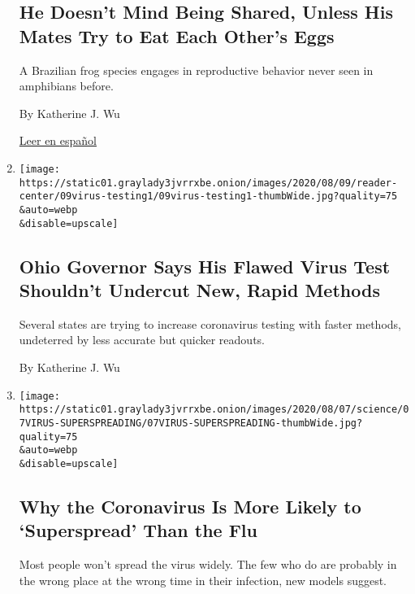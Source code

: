 \begin{enumerate}
{  \subsection{He Doesn't Mind Being Shared, Unless His Mates Try to Eat
  Each Other's
  Eggs}\label{he-doesnt-mind-being-shared-unless-his-mates-try-to-eat-each-others-eggs}}

  A Brazilian frog species engages in reproductive behavior never seen
  in amphibians before.

  By Katherine J. Wu

  \href{https://www.nytimes3xbfgragh.onion/es/2020/08/12/espanol/ciencia-y-tecnologia/ranas-brasil.html}{Leer
  en español}
\item
  \href{/2020/08/09/health/covid-testing.html}{}

  \texttt{[image: https://static01.graylady3jvrrxbe.onion/images/2020/08/09/reader-center/09virus-testing1/09virus-testing1-thumbWide.jpg?quality=75\\\&auto=webp\\\&disable=upscale]}

  \hypertarget{ohio-governor-says-his-flawed-virus-test-shouldnt-undercut-new-rapid-methods}{%
  \subsection{Ohio Governor Says His Flawed Virus Test Shouldn't
  Undercut New, Rapid
  Methods}\label{ohio-governor-says-his-flawed-virus-test-shouldnt-undercut-new-rapid-methods}}

  Several states are trying to increase coronavirus testing with faster
  methods, undeterred by less accurate but quicker readouts.

  By Katherine J. Wu
\item
  \href{/2020/08/07/health/coronavirus-superspreading-contagion.html}{}

  \texttt{[image: https://static01.graylady3jvrrxbe.onion/images/2020/08/07/science/07VIRUS-SUPERSPREADING/07VIRUS-SUPERSPREADING-thumbWide.jpg?quality=75\\\&auto=webp\\\&disable=upscale]}

  \hypertarget{why-the-coronavirus-is-more-likely-to-superspread-than-the-flu}{%
  \subsection{Why the Coronavirus Is More Likely to `Superspread' Than
  the
  Flu}\label{why-the-coronavirus-is-more-likely-to-superspread-than-the-flu}}

  Most people won't spread the virus widely. The few who do are probably
  in the wrong place at the wrong time in their infection, new models
  suggest.


\end{enumerate}
